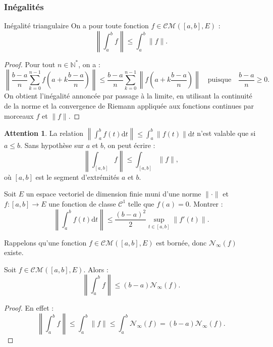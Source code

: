 \documentclass[french]{article}
\newcommand{\N}{\mathbb{N}}
\newcommand{\st}{^*}
\renewcommand{\d}{\text{d}}
\theoremstyle{plain}
\theoremstyle{definition}
\newtheorem*{attention}{Attention}
\theoremstyle{remark}
\begin{document}
\subsubsection*{Inégalités}

\begin{thm}{Inégalité triangulaire}%
	On a pour toute fonction $f\in\mathcal{CM}([a,b],E)$ :
	$$\left\lVert\int_{a}^{b}f\right\rVert\leqslant\int_{a}^{b}\lVert f\rVert.$$
\end{thm}
\begin{proof}
	Pour tout $n\in\N\st$, on a :
	$$\left\lVert\frac{b-a}{n}\sum_{k=0}^{n-1}f\left(a+k\frac{b-a}{n}\right)\right\rVert\leqslant\frac{b-a}{n}\sum_{k=0}^{n-1}\left\lVert f\left(a+k\frac{b-a}{n}\right)\right\rVert\quad\text{puisque}\quad\frac{b-a}{n}\geqslant0.$$
	On obtient l'inégalité annoncée par passage à la limite, en utilisant la continuité de la norme et la convergence de Riemann appliquée aux fonctions continues par morceaux $f$ et $\lVert f\rVert$.
\end{proof}

\begin{attention}
	La relation $\displaystyle \left\lVert\int_{a}^{b}f(t)\d t\right\rVert\leqslant\int_{a}^{b}\lVert f(t)\rVert\d t$ n'est valable que si $a\leqslant b$. Sans hypothèse sur $a$ et $b$, on peut écrire :
	$$\left\lVert\int_{[a,b]}f\right\rVert\leqslant\int_{[a,b]}\lVert f\rVert,$$ où $[a,b]$ est le segment d'extrémités $a$ et $b$.
\end{attention}

\begin{exo}
	Soit $E$ un espace vectoriel de dimension finie muni d'une norme $\lVert\cdot\rVert$ et $f:[a,b]\to E$ une fonction de classe $\mathcal{C}^1$ telle que $f(a)=0$. Montrer :
	$$\left\lVert\int_{a}^{b}f(t)\d t\right\rVert\leqslant\frac{(b-a)^2}{2}\underset{t\in[a,b]}{\sup}\lVert f'(t)\rVert.$$
\end{exo}

Rappelons qu'une fonction $f\in\mathcal{CM}([a,b],E)$ est bornée, donc $\mathcal{N}_\infty(f)$ existe.

\begin{cor}%
	Soit $f\in\mathcal{CM}([a,b],E)$. Alors :
	$$\left\lVert\int_{a}^{b}f\right\rVert \leqslant(b-a)\mathcal{N}_\infty(f).$$
\end{cor}
\begin{proof}
	En effet :
	$$\left\lVert\int_{a}^{b}f\right\rVert\leqslant\int_{a}^{b}\lVert f\rVert\leqslant\int_{a}^{b}\mathcal{N}_\infty(f)=(b-a)\mathcal{N}_\infty(f).$$
\end{proof}
\end{document}
